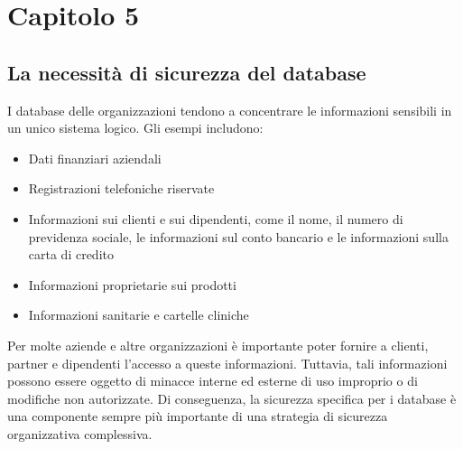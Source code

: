 \chapter{Capitolo 5}
\section{La necessità di sicurezza del database}
I database delle organizzazioni tendono a concentrare le informazioni sensibili in un unico sistema logico. Gli esempi includono:
\begin{itemize}
    \item Dati finanziari aziendali
    
    \item Registrazioni telefoniche riservate
    
    \item Informazioni sui clienti e sui dipendenti, come il nome, il numero di previdenza sociale, le informazioni sul conto bancario e le informazioni sulla carta di credito
    
    \item Informazioni proprietarie sui prodotti
    
    \item Informazioni sanitarie e cartelle cliniche 
\end{itemize}
Per molte aziende e altre organizzazioni è importante poter fornire a clienti, partner e dipendenti l'accesso a queste informazioni. Tuttavia, tali informazioni possono essere oggetto di minacce interne ed esterne di uso improprio o di modifiche non autorizzate. Di conseguenza, la sicurezza specifica per i database è una componente sempre più importante di una strategia di sicurezza organizzativa complessiva. 

\singlespacing

